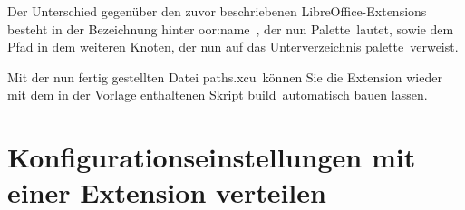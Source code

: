\documentclass[a4paper,10pt,pagesize,titlepage]{scrbook}
\begin{document}
Der Unterschied gegenüber den zuvor beschriebenen LibreOffice-Extensions besteht in der Bezeichnung hinter \glqq oor:name\grqq~, der nun \glqq Palette\grqq~lautet, sowie dem Pfad in dem weiteren Knoten, der nun auf das Unterverzeichnis \glqq palette\grqq~verweist.

Mit der nun fertig gestellten Datei \glqq paths.xcu\grqq~können Sie die Extension wieder mit dem in der Vorlage enthaltenen Skript \glqq build\grqq~automatisch bauen lassen.

\chapter{Konfigurationseinstellungen mit einer Extension verteilen}
\end{document}
